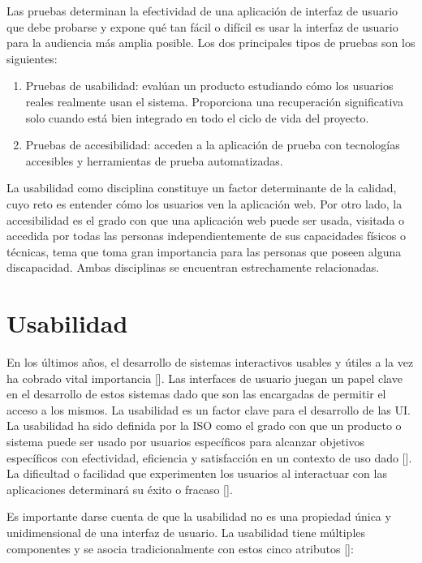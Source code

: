 Las pruebas determinan la efectividad de una aplicación de interfaz de usuario que debe probarse y expone qué tan fácil o difícil es usar la interfaz de usuario para la audiencia más amplia posible. Los dos principales tipos de pruebas son los siguientes:

\begin{enumerate}
\item Pruebas de usabilidad: evalúan un producto estudiando cómo los usuarios reales realmente usan el sistema. Proporciona una recuperación significativa solo cuando está bien integrado en todo el ciclo de vida del proyecto.
\item Pruebas de accesibilidad: acceden a la aplicación de prueba con tecnologías accesibles y herramientas de prueba automatizadas.
\end{enumerate}

La usabilidad como disciplina constituye un factor determinante de la calidad, cuyo reto es entender cómo los usuarios ven la aplicación web. Por otro lado, la accesibilidad es el grado con que una aplicación web puede ser usada, visitada o accedida por todas las personas independientemente de sus capacidades físicos o técnicas, tema que toma gran importancia para las personas que poseen alguna discapacidad. Ambas disciplinas se encuentran estrechamente relacionadas.

\section{Usabilidad}

En los últimos años, el desarrollo de sistemas interactivos usables y útiles a la vez ha cobrado vital importancia [\cite{1,32}]. Las interfaces de usuario juegan un papel clave en el desarrollo de estos sistemas dado que son las encargadas de  permitir el acceso a los mismos. La usabilidad es un factor clave para el desarrollo de las UI. La usabilidad ha sido definida por la ISO como el grado con que un producto o sistema puede ser usado por usuarios específicos para alcanzar objetivos específicos con efectividad, eficiencia y satisfacción en un contexto de uso dado [\cite{33}]. La dificultad o facilidad que experimenten los usuarios al interactuar con las aplicaciones determinará su éxito o fracaso [\cite{34}]. 

Es importante darse cuenta de que la usabilidad no es una propiedad única y unidimensional de una interfaz de usuario. La usabilidad tiene múltiples componentes y se asocia tradicionalmente con estos cinco atributos [\cite{36}]:


